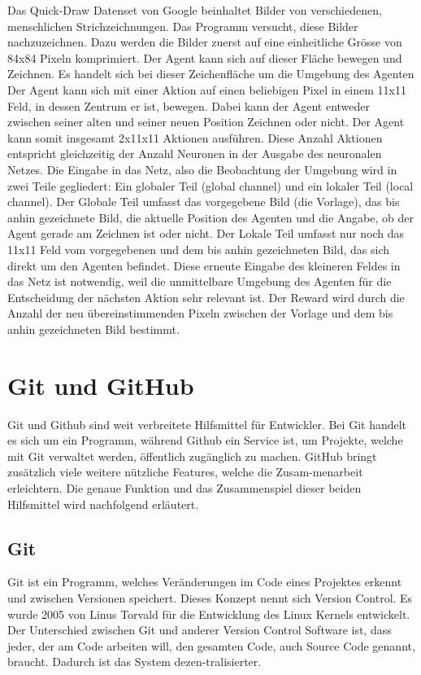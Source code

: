 Das Quick-Draw Datenset von Google beinhaltet Bilder von verschiedenen,
menschlichen Strichzeichnungen. Das Programm versucht, diese Bilder
nachzuzeichnen. Dazu werden die Bilder zuerst auf eine einheitliche Grösse von
84x84 Pixeln komprimiert. Der Agent kann sich auf dieser Fläche bewegen und
Zeichnen. Es handelt sich bei dieser Zeichenfläche um die Umgebung des Agenten
Der Agent kann sich mit einer Aktion auf einen beliebigen Pixel in einem 11x11
Feld, in dessen Zentrum er ist, bewegen. Dabei kann der Agent entweder zwischen
seiner alten und seiner neuen Position Zeichnen oder nicht. Der Agent kann somit
insgesamt 2x11x11 Aktionen ausführen. Diese Anzahl Aktionen entspricht
gleichzeitig der Anzahl Neuronen in der Ausgabe des neuronalen Netzes. Die
Eingabe in das Netz, also die Beobachtung der Umgebung wird in zwei Teile
gegliedert: Ein globaler Teil (global channel) und ein lokaler Teil (local
channel). Der Globale Teil umfasst das vorgegebene Bild (die Vorlage), das bis
anhin gezeichnete Bild, die aktuelle Position des Agenten und die Angabe, ob der
Agent gerade am Zeichnen ist oder nicht. Der Lokale Teil umfasst nur noch das
11x11 Feld vom vorgegebenen und dem bis anhin gezeichneten Bild, das sich direkt
um den Agenten befindet. Diese erneute Eingabe des kleineren Feldes in das Netz
ist notwendig, weil die unmittelbare Umgebung des Agenten für die Entscheidung
der nächsten Aktion sehr relevant ist. Der Reward wird durch die Anzahl der neu
übereinstimmenden Pixeln zwischen der Vorlage und dem bis anhin
gezeichneten Bild bestimmt. 

\section{Git und GitHub}
\label{chap:git_github}
Git und Github sind weit verbreitete Hilfsmittel für Entwickler. Bei Git handelt
es sich um ein Programm, während Github ein Service ist, um Projekte, welche mit
Git verwaltet werden, öffentlich zugänglich zu machen. GitHub bringt zusätzlich
viele weitere nützliche Features, welche die Zusam\hyp{}menarbeit erleichtern. Die
genaue Funktion und das Zusammenspiel dieser beiden Hilfsmittel wird nachfolgend
erläutert.

\subsection*{Git}
Git ist ein Programm, welches Veränderungen im Code eines Projektes erkennt und
zwischen Versionen speichert. Dieses Konzept nennt sich Version Control. Es
wurde 2005 von Linus Torvald für die Entwicklung des Linux Kernels entwickelt.
Der Unterschied zwischen Git und anderer Version Control Software ist, dass
jeder, der am Code arbeiten will, den gesamten Code, auch Source Code genannt,
braucht. Dadurch ist das System dezen\hyp{}tralisierter.
\cite{noauthor_git_2021}

